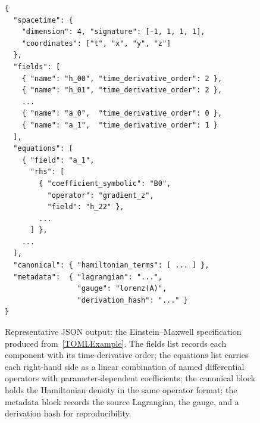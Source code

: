 \begin{figure}[t]
\begin{lstlisting}[frame=single,keepspaces=true,basicstyle=\footnotesize\ttfamily]
{
  "spacetime": {
    "dimension": 4, "signature": [-1, 1, 1, 1],
    "coordinates": ["t", "x", "y", "z"]
  },
  "fields": [
    { "name": "h_00", "time_derivative_order": 2 },
    { "name": "h_01", "time_derivative_order": 2 },
    ...
    { "name": "a_0",  "time_derivative_order": 0 },
    { "name": "a_1",  "time_derivative_order": 1 }
  ],
  "equations": [
    { "field": "a_1",
      "rhs": [
        { "coefficient_symbolic": "B0",
          "operator": "gradient_z",
          "field": "h_22" },
        ...
      ] },
    ...
  ],
  "canonical": { "hamiltonian_terms": [ ... ] },
  "metadata":  { "lagrangian": "...",
                 "gauge": "lorenz(A)",
                 "derivation_hash": "..." }
}
\end{lstlisting}
\caption{Representative JSON output: the Einstein--Maxwell
specification produced from~\cref{TOMLExample}. The fields list
records each component with its time-derivative order; the equations
list carries each right-hand side as a linear combination of named
differential operators with parameter-dependent coefficients; the
canonical block holds the Hamiltonian density in the same operator
format; the metadata block records the source Lagrangian, the gauge,
and a derivation hash for reproducibility.}
\label{JSONExample}
\end{figure}

